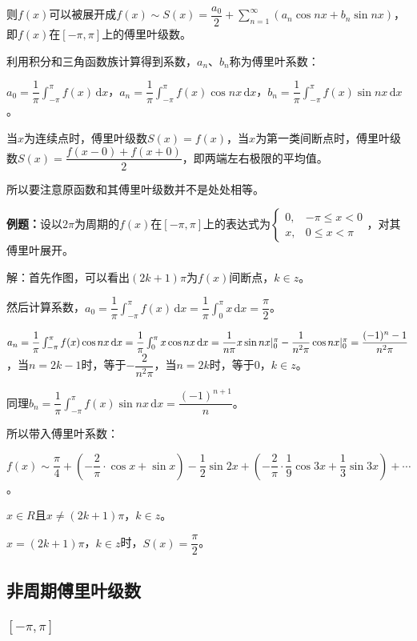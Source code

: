 则$f(x)$可以被展开成$f(x)\sim S(x)=\dfrac{a_0}{2}+\sum\limits_{n=1}^\infty(a_n\cos nx+b_n\sin nx)$，即$f(x)$在$[-\pi,\pi]$上的傅里叶级数。

利用积分和三角函数族计算得到系数，$a_n$、$b_n$称为傅里叶系数：

$a_0=\dfrac{1}{\pi}\int_{-\pi}^\pi f(x)\,\textrm{d}x$，$a_n=\dfrac{1}{\pi}\int_{-\pi}^\pi f(x)\cos nx\,\textrm{d}x$，$b_n=\dfrac{1}{\pi}\int_{-\pi}^\pi f(x)\sin nx\,\textrm{d}x$。

当$x$为连续点时，傅里叶级数$S(x)=f(x)$，当$x$为第一类间断点时，傅里叶级数$S(x)=\dfrac{f(x-0)+f(x+0)}{2}$，即两端左右极限的平均值。

所以要注意原函数和其傅里叶级数并不是处处相等。

\textbf{例题：}设以$2\pi$为周期的$f(x)$在$[-\pi,\pi]$上的表达式为$\left\{\begin{array}{ll}
    0, & -\pi\leqslant x<0 \\
    x, & 0\leqslant x<\pi
\end{array}\right.$，对其傅里叶展开。

解：首先作图，可以看出$(2k+1)\pi$为$f(x)$间断点，$k\in z$。

然后计算系数，$a_0=\dfrac{1}{\pi}\int_{-\pi}^\pi f(x)\,\textrm{d}x=\dfrac{1}{\pi}\int_0^\pi x\,\textrm{d}x=\dfrac{\pi}{2}$。

$a_n=\dfrac{1}{\pi}\int_{-\pi}^\pi f(x)\cos nx\,\textrm{d}x=\dfrac{1}{\pi}\int_0^\pi x\cos nx\,\textrm{d}x=\dfrac{1}{n\pi}x\sin nx\vert_0^\pi-\dfrac{1}{n^2\pi}\cos nx\vert_0^\pi\\=\dfrac{(-1)^n-1}{n^2\pi}$，当$n=2k-1$时，等于$-\dfrac{2}{n^2\pi}$，当$n=2k$时，等于0，$k\in z$。

同理$b_n=\dfrac{1}{\pi}\int_{-\pi}^\pi f(x)\sin nx\,\textrm{d}x=\dfrac{(-1)^{n+1}}{n}$。

所以带入傅里叶系数：

$f(x)\sim\dfrac{\pi}{4}+\left(-\dfrac{2}{\pi}\cdot\cos x+\sin x\right)-\dfrac{1}{2}\sin2x+\left(-\dfrac{2}{\pi}\cdot\dfrac{1}{9}\cos3x+\dfrac{1}{3}\sin3x\right)+\cdots$。

$x\in R$且$x\neq(2k+1)\pi$，$k\in z$。

$x=(2k+1)\pi$，$k\in z$时，$S(x)=\dfrac{\pi}{2}$。

\subsection{非周期傅里叶级数}

\subsubsection{\texorpdfstring{$[-\pi,\pi]$}n}

